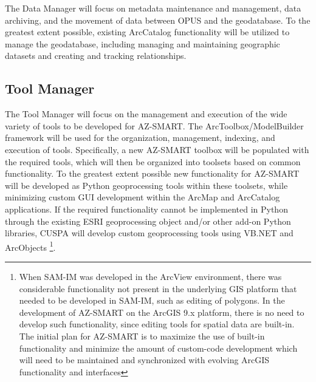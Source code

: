 The Data Manager will focus on metadata maintenance and management,
data archiving, and the movement of data between OPUS and the geodatabase.
To the greatest extent possible, existing ArcCatalog functionality will
be utilized to manage the geodatabase, including managing and maintaining
geographic datasets and creating and tracking relationships.


\subsection{Tool Manager}

The Tool Manager will focus on the management and execution of the wide
variety of tools to be developed for AZ-SMART.  The ArcToolbox/ModelBuilder
framework will be used for the organization, management, indexing, and
execution of tools.  Specifically, a new AZ-SMART toolbox will be populated
with the required tools, which will then be organized into toolsets based
on common functionality.  To the greatest extent possible new
functionality for AZ-SMART will be developed as Python geoprocessing tools
within these toolsets, while minimizing custom GUI development within
the ArcMap and ArcCatalog applications.  If the required functionality
cannot be implemented in Python through the existing ESRI geoprocessing
object and/or other add-on Python libraries, CUSPA will develop custom
geoprocessing tools using VB.NET and ArcObjects \footnote{When SAM-IM was
developed in the ArcView environment, there was
considerable functionality not present in the underlying GIS
platform that needed to be developed in SAM-IM, such as editing of
polygons.  In the development of AZ-SMART on the ArcGIS 9.x
platform, there is no need to develop such functionality, since
editing tools for spatial data are built-in.  The initial plan for
AZ-SMART is to maximize the use of built-in functionality and
minimize the amount of custom-code development which will need to be
maintained and synchronized with evolving ArcGIS functionality and
interfaces}.


